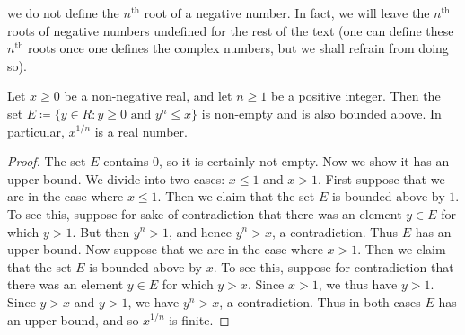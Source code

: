 \begin{note}
    we do not define the \(n^{\text{th}}\) root of a negative number.
    In fact, we will leave the \(n^{\text{th}}\) roots of negative numbers undefined for the rest of the text
    (one can define these \(n^{\text{th}}\) roots once one defines the complex numbers, but we shall refrain from doing so).
\end{note}

\begin{lemma}\label{5.6.5}
    Let \(x \geq 0\) be a non-negative real, and let \(n \geq 1\) be a positive integer.
    Then the set \(E \coloneqq \{y \in R : y \geq 0 \text{ and } y^n \leq x\}\) is non-empty and is also bounded above.
    In particular, \(x^{1 / n}\) is a real number.
\end{lemma}

\begin{proof}
    The set \(E\) contains \(0\), so it is certainly not empty.
    Now we show it has an upper bound.
    We divide into two cases: \(x \leq 1\) and \(x > 1\).
    First suppose that we are in the case where \(x \leq 1\).
    Then we claim that the set \(E\) is bounded above by \(1\).
    To see this, suppose for sake of contradiction that there was an element \(y \in E\) for which \(y > 1\).
    But then \(y^n > 1\), and hence \(y^n > x\), a contradiction.
    Thus \(E\) has an upper bound.
    Now suppose that we are in the case where \(x > 1\).
    Then we claim that the set \(E\) is bounded above by \(x\).
    To see this, suppose for contradiction that there was an element \(y \in E\) for which \(y > x\).
    Since \(x > 1\), we thus have \(y > 1\).
    Since \(y > x\) and \(y > 1\), we have \(y^n > x\), a contradiction.
    Thus in both cases \(E\) has an upper bound, and so \(x^{1 / n}\) is finite.
\end{proof}

